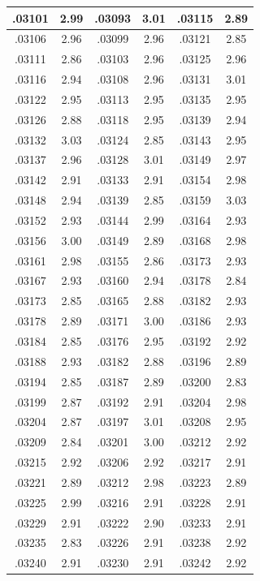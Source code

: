 \documentclass[10pt,twoside]{report}
\begin{document}
\begin{appendices}
\begin{longtable}{|c|c||c|c||c|c|}
.03101 & 2.99 & .03093 & 3.01 & .03115 & 2.89\\\hline
.03106 & 2.96 & .03099 & 2.96 & .03121 & 2.85\\\hline
.03111 & 2.86 & .03103 & 2.96 & .03125 & 2.96\\\hline
.03116 & 2.94 & .03108 & 2.96 & .03131 & 3.01\\\hline
.03122 & 2.95 & .03113 & 2.95 & .03135 & 2.95\\\hline
.03126 & 2.88 & .03118 & 2.95 & .03139 & 2.94\\\hline
.03132 & 3.03 & .03124 & 2.85 & .03143 & 2.95\\\hline
.03137 & 2.96 & .03128 & 3.01 & .03149 & 2.97\\\hline
.03142 & 2.91 & .03133 & 2.91 & .03154 & 2.98\\\hline
.03148 & 2.94 & .03139 & 2.85 & .03159 & 3.03\\\hline
.03152 & 2.93 & .03144 & 2.99 & .03164 & 2.93\\\hline
.03156 & 3.00 & .03149 & 2.89 & .03168 & 2.98\\\hline
.03161 & 2.98 & .03155 & 2.86 & .03173 & 2.93\\\hline
.03167 & 2.93 & .03160 & 2.94 & .03178 & 2.84\\\hline
.03173 & 2.85 & .03165 & 2.88 & .03182 & 2.93\\\hline
.03178 & 2.89 & .03171 & 3.00 & .03186 & 2.93\\\hline
.03184 & 2.85 & .03176 & 2.95 & .03192 & 2.92\\\hline
.03188 & 2.93 & .03182 & 2.88 & .03196 & 2.89\\\hline
.03194 & 2.85 & .03187 & 2.89 & .03200 & 2.83\\\hline
.03199 & 2.87 & .03192 & 2.91 & .03204 & 2.98\\\hline
.03204 & 2.87 & .03197 & 3.01 & .03208 & 2.95\\\hline
.03209 & 2.84 & .03201 & 3.00 & .03212 & 2.92\\\hline
.03215 & 2.92 & .03206 & 2.92 & .03217 & 2.91\\\hline
.03221 & 2.89 & .03212 & 2.98 & .03223 & 2.89\\\hline
.03225 & 2.99 & .03216 & 2.91 & .03228 & 2.91\\\hline
.03229 & 2.91 & .03222 & 2.90 & .03233 & 2.91\\\hline
.03235 & 2.83 & .03226 & 2.91 & .03238 & 2.92\\\hline
.03240 & 2.91 & .03230 & 2.91 & .03242 & 2.92\\\hline

\end{longtable}
\end{appendices}
\end{document}
